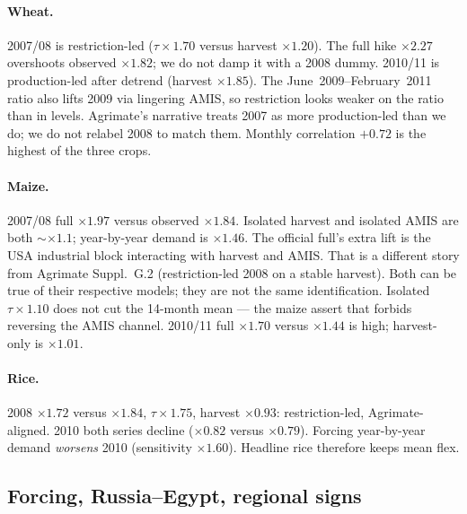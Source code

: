 \documentclass[11pt,a4paper]{article}
\begin{document}
\begin{table}[H]
\centering
\caption{Attribution: isolated legs versus official full. Isolated
\texttt{demand} is year-by-year flex+industrial with climatology harvest
and no AMIS --- a sensitivity, not the official split.}
\label{tab:attr}
\small

\end{table}

\paragraph{Wheat.}
2007/08 is restriction-led ($\tau\times 1.70$ versus harvest $\times 1.20$).
The full hike $\times 2.27$ overshoots observed $\times 1.82$; we do not
damp it with a 2008 dummy. 2010/11 is production-led after detrend
(harvest $\times 1.85$). The June~2009--February~2011 ratio also lifts 2009
via lingering AMIS, so restriction looks weaker on the ratio than in
levels. Agrimate's narrative treats 2007 as more production-led than we
do; we do not relabel 2008 to match them. Monthly correlation $+0.72$ is
the highest of the three crops.

\paragraph{Maize.}
2007/08 full $\times 1.97$ versus observed $\times 1.84$. Isolated harvest
and isolated AMIS are both $\sim\times 1.1$; year-by-year demand is
$\times 1.46$. The official full's extra lift is the USA industrial
block interacting with harvest and AMIS. That is a different story from
Agrimate Suppl.~G.2 (restriction-led 2008 on a stable harvest). Both can
be true of their respective models; they are not the same identification.
Isolated $\tau\times 1.10$ does not cut the 14-month mean --- the maize
assert that forbids reversing the AMIS channel. 2010/11 full $\times 1.70$
versus $\times 1.44$ is high; harvest-only is $\times 1.01$.

\paragraph{Rice.}
2008 $\times 1.72$ versus $\times 1.84$, $\tau\times 1.75$, harvest
$\times 0.93$: restriction-led, Agrimate-aligned. 2010 both series decline
($\times 0.82$ versus $\times 0.79$). Forcing year-by-year demand
\emph{worsens} 2010 (sensitivity $\times 1.60$). Headline rice therefore
keeps mean flex.

\subsection{Forcing, Russia--Egypt, regional signs}
\end{document}

